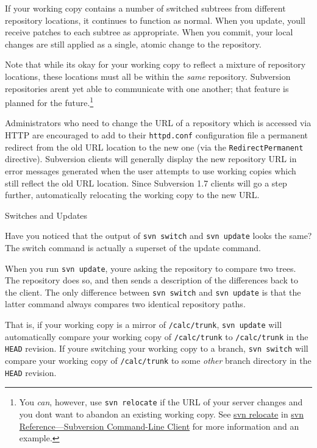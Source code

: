 If your working copy contains a number of switched subtrees from
different repository locations, it continues to function as normal. When
you update, you\textquotesingle ll receive patches to each subtree as
appropriate. When you commit, your local changes are still applied as a
single, atomic change to the repository.

Note that while it\textquotesingle s okay for your working copy to
reflect a mixture of repository locations, these locations must all be
within the \emph{same} repository. Subversion repositories
aren\textquotesingle t yet able to communicate with one another; that
feature is planned for the future.\footnote{You \emph{can}, however, use
  \texttt{svn\ relocate} if the URL of your server changes and you
  don\textquotesingle t want to abandon an existing working copy. See
  \hyperref[svn.ref.svn.c.relocate]{svn relocate} in
  \hyperref[svn.ref.svn]{svn Reference---Subversion Command-Line Client}
  for more information and an example.}

Administrators who need to change the URL of a repository which is
accessed via HTTP are encouraged to add to their \texttt{httpd.conf}
configuration file a permanent redirect from the old URL location to the
new one (via the \texttt{RedirectPermanent} directive). Subversion
clients will generally display the new repository URL in error messages
generated when the user attempts to use working copies which still
reflect the old URL location. Since Subversion 1.7 clients will go a
step further, automatically relocating the working copy to the new URL.

Switches and Updates

Have you noticed that the output of \texttt{svn\ switch} and
\texttt{svn\ update} looks the same? The switch command is actually a
superset of the update command.

When you run \texttt{svn\ update}, you\textquotesingle re asking the
repository to compare two trees. The repository does so, and then sends
a description of the differences back to the client. The only difference
between \texttt{svn\ switch} and \texttt{svn\ update} is that the latter
command always compares two identical repository paths.

That is, if your working copy is a mirror of \texttt{/calc/trunk},
\texttt{svn\ update} will automatically compare your working copy of
\texttt{/calc/trunk} to \texttt{/calc/trunk} in the \texttt{HEAD}
revision. If you\textquotesingle re switching your working copy to a
branch, \texttt{svn\ switch} will compare your working copy of
\texttt{/calc/trunk} to some \emph{other} branch directory in the
\texttt{HEAD} revision.

